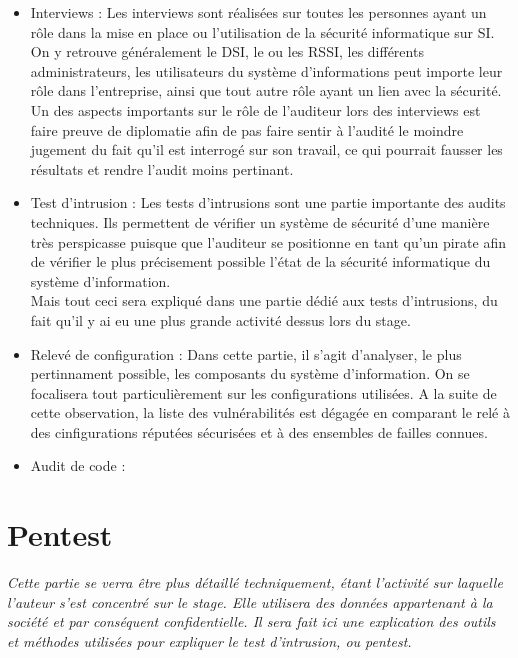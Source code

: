 \documentclass[a4paper]{memoir}
\begin{document}
\begin{itemize}
  \item Interviews : Les interviews sont réalisées sur toutes les personnes ayant un rôle dans la mise en place ou l'utilisation de la sécurité informatique sur SI.
On y retrouve généralement le DSI, le ou les RSSI, les différents administrateurs, les utilisateurs du système d'informations peut importe leur rôle dans l'entreprise, ainsi que tout autre rôle ayant un lien avec la sécurité.\\
Un des aspects importants sur le rôle de l'auditeur lors des interviews est faire preuve de diplomatie afin de pas faire sentir à l'audité le moindre jugement du fait qu'il est interrogé sur son travail, ce qui pourrait fausser les résultats et rendre l'audit moins pertinant.

\item Test d'intrusion : Les tests d'intrusions sont une partie importante des audits techniques. Ils permettent de vérifier un système de sécurité d'une manière très perspicasse puisque que l'auditeur se positionne en tant qu'un pirate afin de vérifier le plus précisement possible l'état de la sécurité informatique du système d'information.\\
  Mais tout ceci sera expliqué dans une partie dédié aux tests d'intrusions, du fait qu'il y ai eu une plus grande activité dessus lors du stage.

\item Relevé de configuration : Dans cette partie, il s'agit d'analyser, le plus pertinnament possible, les composants du système d'information. On se focalisera tout particulièrement sur les configurations utilisées. A la suite de cette observation, la liste des vulnérabilités est dégagée en comparant le relé à des cinfigurations réputées sécurisées et à des ensembles de failles connues.

  \item Audit de code : 

\end{itemize}

  
\section{Pentest}

\textit{Cette partie se verra être plus détaillé techniquement, étant l'activité sur laquelle l'auteur s'est concentré sur le stage. Elle utilisera des données appartenant à la société et par conséquent confidentielle. Il sera fait ici une explication des outils et méthodes utilisées pour expliquer le test d'intrusion, ou pentest.}\\
\end{document}
